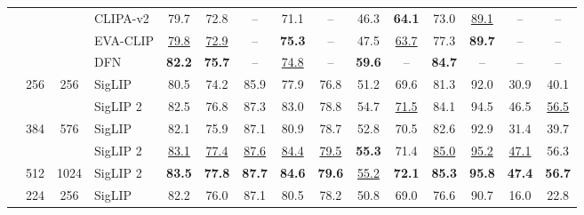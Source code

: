 \begin{tabular}{lcclccccccccccc}
 &  &  & CLIPA-v2 \cite{li2023clipa} & 79.7 & 72.8 & -- & 71.1 & -- & 46.3 & \bf{64.1} & 73.0 & \underline{89.1} & -- & -- \\
 &  &  & EVA-CLIP \cite{sun2023eva} & \underline{79.8} & \underline{72.9} & -- & \bf{75.3} & -- & 47.5 & \underline{63.7} & 77.3 & \bf{89.7} & -- & -- \\
 &  &  & DFN \cite{fang2024dfn} & \bf{82.2} & \bf{75.7} & -- & \underline{74.8} & -- & \bf{59.6} & -- & \bf{84.7} & -- & -- & -- \\
\arrayrulecolor{black}\hhline{|---------------|} 
\multirow[c]{5}{*}{L/16} & \multirow[c]{2}{*}{256} & \multirow[c]{2}{*}{256} & SigLIP \cite{siglip} & 80.5 & 74.2 & 85.9 & 77.9 & 76.8 & 51.2 & 69.6 & 81.3 & 92.0 & 30.9 & 40.1 \\
 &  &  & \cellcolor{gray!15}SigLIP 2 & \cellcolor{gray!15}82.5 & \cellcolor{gray!15}76.8 & \cellcolor{gray!15}87.3 & \cellcolor{gray!15}83.0 & \cellcolor{gray!15}78.8 & \cellcolor{gray!15}54.7 & \cellcolor{gray!15}\underline{71.5} & \cellcolor{gray!15}84.1 & \cellcolor{gray!15}94.5 & \cellcolor{gray!15}46.5 & \cellcolor{gray!15}\underline{56.5} \\
\arrayrulecolor{lightgray}\hhline{|~|--------------|} 
 & \multirow[c]{2}{*}{384} & \multirow[c]{2}{*}{576} & SigLIP \cite{siglip} & 82.1 & 75.9 & 87.1 & 80.9 & 78.7 & 52.8 & 70.5 & 82.6 & 92.9 & 31.4 & 39.7 \\
 &  &  & \cellcolor{gray!15}SigLIP 2 & \cellcolor{gray!15}\underline{83.1} & \cellcolor{gray!15}\underline{77.4} & \cellcolor{gray!15}\underline{87.6} & \cellcolor{gray!15}\underline{84.4} & \cellcolor{gray!15}\underline{79.5} & \cellcolor{gray!15}\bf{55.3} & \cellcolor{gray!15}71.4 & \cellcolor{gray!15}\underline{85.0} & \cellcolor{gray!15}\underline{95.2} & \cellcolor{gray!15}\underline{47.1} & \cellcolor{gray!15}56.3 \\
\arrayrulecolor{lightgray}\hhline{|~|--------------|} 
 & 512 & 1024 & \cellcolor{gray!15}SigLIP 2 & \cellcolor{gray!15}\bf{83.5} & \cellcolor{gray!15}\bf{77.8} & \cellcolor{gray!15}\bf{87.7} & \cellcolor{gray!15}\bf{84.6} & \cellcolor{gray!15}\bf{79.6} & \cellcolor{gray!15}\underline{55.2} & \cellcolor{gray!15}\bf{72.1} & \cellcolor{gray!15}\bf{85.3} & \cellcolor{gray!15}\bf{95.8} & \cellcolor{gray!15}\bf{47.4} & \cellcolor{gray!15}\bf{56.7} \\
\arrayrulecolor{black}\hhline{|---------------|} 
\multirow[c]{4}{*}{So/14} & \multirow[c]{2}{*}{224} & \multirow[c]{2}{*}{256} & SigLIP \cite{siglip} & 82.2 & 76.0 & 87.1 & 80.5 & 78.2 & 50.8 & 69.0 & 76.6 & 90.7 & 16.0 & 22.8 \\

\end{tabular}
